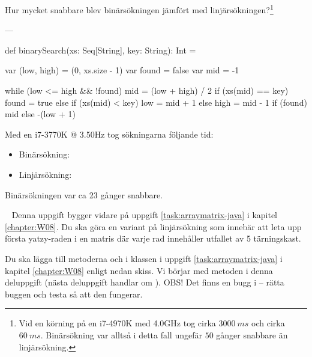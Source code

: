 \Subtask Hur mycket snabbare blev binärsökningen jämfört med linjärsökningen?\footnote{Vid en körning på en i7-4970K med 4.0GHz tog  cirka $3000~ms$ och  cirka $60~ms$. Binärsökning var alltså i detta fall ungefär $50$ gånger snabbare än linjärsökning.}


\SOLUTION


\TaskSolved \what


\SubtaskSolved ---

\SubtaskSolved
\begin{Code}
def binarySearch(xs: Seq[String], key: String): Int = {

  var (low, high) = (0, xs.size - 1)
  var found = false
  var mid = -1

  while (low <= high && !found) {
    mid = (low + high) / 2
    if (xs(mid) == key) found = true
    else if (xs(mid) < key) low = mid + 1
    else high = mid - 1
  }
  if (found)
    mid
  else
    -(low + 1)
}
\end{Code}

\SubtaskSolved
Med en i7-3770K @ 3.50Hz tog sökningarna följande tid:

\begin{itemize}
\item Binärsökning: 
\item Linjärsökning: 
\end{itemize}

\SubtaskSolved
Binärsökningen var ca 23 gånger snabbare.



\QUESTEND







\QUESTBEGIN

\Task  \what~  Denna uppgift bygger vidare på uppgift \ref{task:arraymatrix-java} i kapitel \ref{chapter:W08}. Du ska göra en variant på linjärsökning som innebär att leta upp första yatzy-raden i en matris där varje rad innehåller utfallet av 5 tärningskast.

\Subtask Du ska lägga till metoderna  och  i klassen  i uppgift \ref{task:arraymatrix-java} i kapitel \ref{chapter:W08} enligt nedan skiss. Vi börjar med metoden   i denna deluppgift (nästa deluppgift handlar om ). OBS! Det finns en bugg i  -- rätta buggen och testa så att den fungerar.

